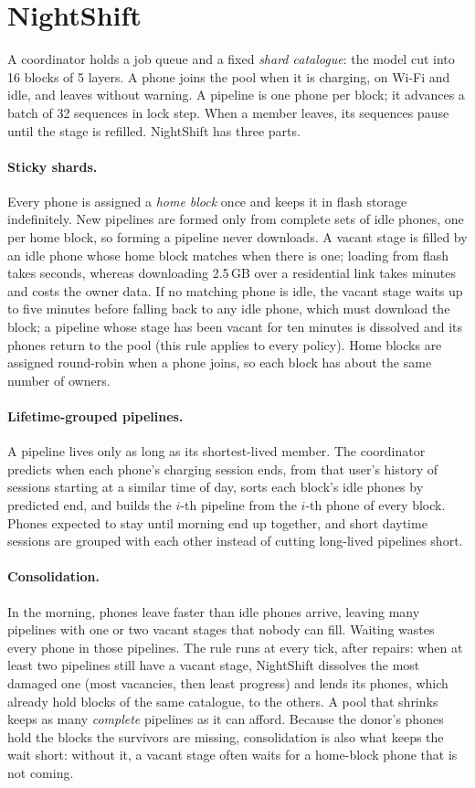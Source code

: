 \documentclass[sigconf,nonacm]{acmart}
\begin{document}
\section{NightShift}
\label{sec:design}

A coordinator holds a job queue and a fixed \emph{shard catalogue}: the model
cut into 16 blocks of 5 layers. A phone joins the pool when it is charging, on
Wi-Fi and idle, and leaves without warning. A pipeline is one phone per block;
it advances a batch of 32 sequences in lock step. When a member leaves, its
sequences pause until the stage is refilled. NightShift has three parts.

\paragraph{Sticky shards.} Every phone is assigned a \emph{home block} once
and keeps it in flash storage indefinitely. New pipelines are formed only
from complete sets of idle phones, one per home block, so forming a pipeline
never downloads. A vacant stage is filled by an idle phone whose home block
matches when there is one; loading from flash takes seconds, whereas
downloading 2.5\,GB over a residential link takes minutes and costs the owner
data. If no matching phone is idle, the vacant stage waits up to five minutes
before falling back to any idle phone, which must download the block; a
pipeline whose stage has been vacant for ten minutes is dissolved and its
phones return to the pool (this rule applies to every policy). Home blocks are
assigned round-robin when a phone joins, so each block has about the same
number of owners.

\paragraph{Lifetime-grouped pipelines.} A pipeline lives only as long as its
shortest-lived member. The coordinator predicts when each phone's charging
session ends, from that user's history of sessions starting at a similar time
of day, sorts each block's idle phones by predicted end, and builds the $i$-th
pipeline from the $i$-th phone of every block. Phones expected to stay until
morning end up together, and short daytime sessions are grouped with each
other instead of cutting long-lived pipelines short.

\paragraph{Consolidation.} In the morning, phones leave faster than idle
phones arrive, leaving many pipelines with one or two vacant stages that
nobody can fill. Waiting wastes every phone in those pipelines. The rule runs
at every tick, after repairs: when at least two pipelines still have a vacant
stage, NightShift dissolves the most damaged one (most
vacancies, then least progress) and lends its phones, which already hold blocks
of the same catalogue, to the others. A pool that shrinks keeps as many
\emph{complete} pipelines as it can afford. Because the donor's phones hold the
blocks the survivors are missing, consolidation is also what keeps the wait
short: without it, a vacant stage often waits for a home-block phone that is
not coming.
\end{document}
